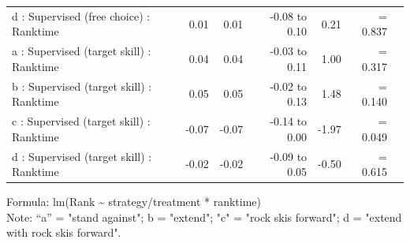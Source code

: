 \documentclass[pdflatex,sn-mathphys-num]{sn-jnl}%
\theoremstyle{thmstyleone}%
\theoremstyle{thmstyletwo}%
\theoremstyle{thmstylethree}%
\begin{document}
\begin{appendices}
\begin{longtable}{lrrrrrl}
d : Supervised (free choice) : Ranktime & 0.01 & 0.01 & -0.08 to 0.10 & 0.21 &  =  0.837 \\ 
a : Supervised (target skill) : Ranktime & 0.04 & 0.04 & -0.03 to 0.11 & 1.00 &  =  0.317 \\ 
b : Supervised (target skill) : Ranktime & 0.05 & 0.05 & -0.02 to 0.13 & 1.48 &  =  0.140 \\ 
c : Supervised (target skill) : Ranktime & -0.07 & -0.07 & -0.14 to 0.00 & -1.97 &  =  0.049 \\ 
d : Supervised (target skill) : Ranktime & -0.02 & -0.02 & -0.09 to 0.05 & -0.50 &  =  0.615 \\ 
\bottomrule
\end{longtable}
\begin{minipage}{\linewidth}
Formula: lm(Rank \textasciitilde{} strategy/treatment * ranktime)\\
Note: “a” = "stand against"; b = "extend"; "c" = "rock skis forward"; d = "extend with rock skis forward". 
\end{minipage}




\end{appendices}
\end{document}
